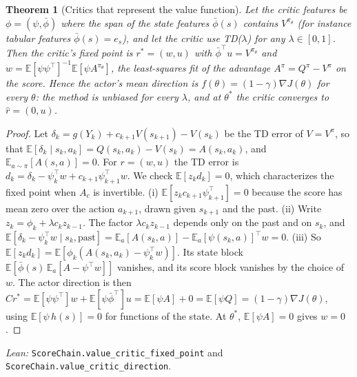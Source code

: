 \documentclass[11pt]{article}
\newtheorem{theorem}{Theorem}[section]
\theoremstyle{definition}
\theoremstyle{remark}
\newcommand{\E}{\mathbb{E}}
\begin{document}
\begin{theorem}[Critics that represent the value function]\label{thm:value}
Let the critic features be $\phi = (\psi, \bar\phi)$ where the span of the state features $\bar\phi(s)$
contains $V^{\pi_\theta}$ (for instance tabular features $\bar\phi(s) = e_s$), and let the critic use
TD($\lambda$) for any $\lambda \in [0,1]$. Then the critic's fixed point is $r^* = (w, u)$ with
$\bar\phi^\top u = V^{\pi_\theta}$ and $w = \E[\psi\psi^\top]^{-1}\E[\psi A^{\pi_\theta}]$, the least-squares fit of
the advantage $A^\pi = Q^\pi - V^\pi$ on the score. Hence the actor's mean direction is
$f(\theta) = (1-\gamma)\nabla J(\theta)$ for every $\theta$: the method is unbiased for every $\lambda$, and at
$\theta^*$ the critic converges to $\hat r = (0, u)$.
\end{theorem}
\begin{proof}
Let $\delta_k = g(Y_k) + c_{k+1}V(s_{k+1}) - V(s_k)$ be the TD error of $V = V^\pi$, so that
$\E[\delta_k\mid s_k, a_k] = Q(s_k,a_k) - V(s_k) = A(s_k,a_k)$, and $\E_{a\sim\pi}[A(s,a)] = 0$. For
$r = (w, u)$ the TD error is
$d_k = \delta_k - \psi_k^\top w + c_{k+1}\psi_{k+1}^\top w$. We check $\E[z_kd_k] = 0$, which characterizes
the fixed point when $A_c$ is invertible.
(i) $\E[z_kc_{k+1}\psi_{k+1}^\top] = 0$ because the score has mean zero over the action $a_{k+1}$, drawn
given $s_{k+1}$ and the past.
(ii) Write $z_k = \phi_k + \lambda c_kz_{k-1}$. The factor $\lambda c_kz_{k-1}$ depends only on the past and on
$s_k$, and $\E[\delta_k - \psi_k^\top w\mid s_k, \text{past}] = \E_a[A(s_k, a)] - \E_a[\psi(s_k,a)]^\top w = 0$.
(iii) So $\E[z_kd_k] = \E[\phi_k(A(s_k,a_k) - \psi_k^\top w)]$. Its state block
$\E[\bar\phi(s)\,\E_a[A - \psi^\top w]]$ vanishes, and its score block vanishes by the choice of $w$.
The actor direction is then $Cr^* = \E[\psi\psi^\top]w + \E[\psi\bar\phi^\top]u = \E[\psi A] + 0 =
\E[\psi Q] = (1-\gamma)\nabla J(\theta)$, using $\E[\psi\,h(s)] = 0$ for functions of the state. At $\theta^*$,
$\E[\psi A] = 0$ gives $w = 0$.
\end{proof}
\noindent\emph{Lean:} \texttt{ScoreChain.value\_critic\_fixed\_point} and
\texttt{ScoreChain.value\_critic\_direction}.
\end{document}
